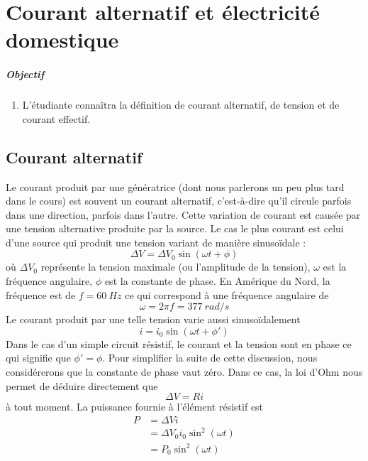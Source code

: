 \chapter{Courant alternatif et électricité domestique}

\paragraph{Objectif}

\begin{enumerate}
  \item L'étudiante connaîtra la définition de courant alternatif, de tension
    et de courant effectif.
\end{enumerate}


\section{Courant alternatif}


Le courant produit par une génératrice (dont nous parlerons un peu plus tard
dans le cours) est souvent un courant alternatif, c'est-à-dire qu'il circule
parfois dans une direction, parfois dans l'autre. Cette variation de courant
est causée par une tension alternative produite par la source. Le cas le plus
courant est celui d'une source qui produit une tension variant de manière
sinusoïdale :
\[
  \Delta V = \Delta V_0 \sin(\omega t + \phi)
\]
où $\Delta V_0$ représente la tension maximale (ou l'amplitude de la tension),
$\omega$ est la fréquence angulaire, $\phi$ est la constante de phase. En
Amérique du Nord, la fréquence est de $f = \SI{60}{Hz}$ ce qui correspond à une
fréquence angulaire de
\[
  \omega = 2 \pi f = \SI{377}{rad/s}
\]
Le courant produit par une telle tension varie aussi sinusoïdalement
\[
  i = i_0 \sin(\omega t + \phi')
\]
Dans le cas d'un simple circuit résistif, le courant et la tension sont en
phase ce qui signifie que $\phi' = \phi$. Pour simplifier la suite de cette
discussion, nous considérerons que la constante de phase vaut zéro. Dans ce
cas, la loi d'Ohm nous permet de déduire directement que
\[
  \Delta V = R i
\]
à tout moment. La puissance fournie à l'élément résistif est
\begin{align*}
  P &= \Delta V i  \\
    &= \Delta V_0 i_0 \sin^2 (\omega t) \\
    &= P_0 \sin^2 (\omega t)
\end{align*}

